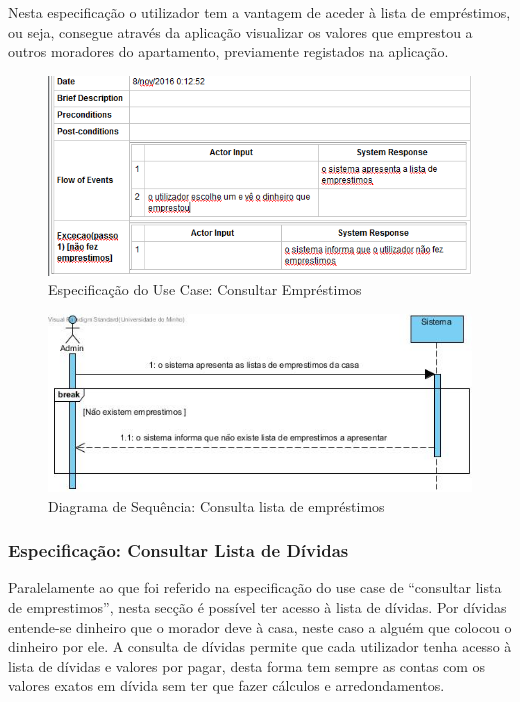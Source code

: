 Nesta especificação o utilizador tem a vantagem de aceder à lista de empréstimos, ou seja, consegue através da aplicação visualizar os valores que emprestou a outros moradores do apartamento, previamente registados na aplicação. 

\begin{figure}[htb!]
	\centering
	\includegraphics[scale=0.7]{imagens/Especificacoes/consultaremprestimos}  
	\caption{Especificação do Use Case: Consultar Empréstimos}  
\end{figure}

\begin{figure}[htb!]
	\centering
	\includegraphics[scale=0.5]{imagens/diagramaSeq/ConsultarListaEmprestimos}  
	\caption{Diagrama de Sequência: Consulta lista de empréstimos}  
\end{figure}

\newpage
\subsubsection{Especificação: Consultar Lista de Dívidas }
Paralelamente ao que foi referido na especificação do use case de “consultar lista de emprestimos”, nesta secção é possível ter acesso à lista de dívidas. Por dívidas entende-se dinheiro que o morador deve à casa, neste caso a alguém que colocou o dinheiro por ele. 
A consulta de dívidas permite que cada utilizador tenha acesso à lista de dívidas e valores por pagar, desta forma tem sempre as contas com os valores exatos em dívida sem ter que fazer cálculos e arredondamentos.

